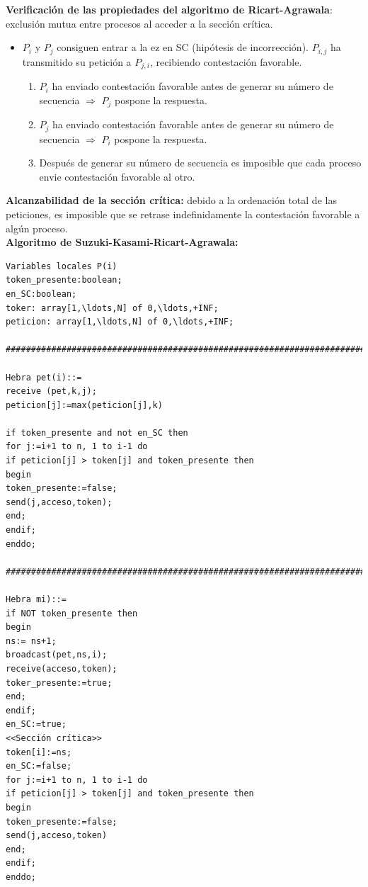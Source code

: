 \documentclass[a4paper,11pt]{article}
\begin{document}
\textbf{Verificación de las propiedades del algoritmo de Ricart-Agrawala}: exclusión mutua entre procesos al  acceder a la sección crítica.

\begin{itemize}
\item $P_i$ y $P_j $ consiguen entrar a la ez en SC (hipótesis de incorrección). $P_{i,j}$ ha transmitido su petición a $P_{j,i}$, recibiendo contestación favorable.

	\begin{enumerate}
		\item $P_i$ ha enviado contestación favorable antes de generar su número de secuencia $\Rightarrow$ $P_j$ pospone la respuesta.
		
		\item $P_j$ ha enviado contestación favorable antes de generar su número de secuencia $\Rightarrow$ $P_i$ pospone la respuesta.
		
		\item Después de generar su número de secuencia es imposible que cada proceso envie contestación favorable al otro.
	\end{enumerate}
\end{itemize}

\textbf{Alcanzabilidad de la sección crítica:} debido a la ordenación total de las peticiones, es imposible que se retrase indefinidamente la contestación favorable a algún proceso. \\

\textbf{Algoritmo de Suzuki-Kasami-Ricart-Agrawala:}

\begin{verbatim}
Variables locales P(i)
token_presente:boolean;
en_SC:boolean;
toker: array[1,\ldots,N] of 0,\ldots,+INF;
peticion: array[1,\ldots,N] of 0,\ldots,+INF;

########################################################################

Hebra pet(i)::=
receive (pet,k,j);
peticion[j]:=max(peticion[j],k)

if token_presente and not en_SC then
for j:=i+1 to n, 1 to i-1 do
if peticion[j] > token[j] and token_presente then
begin
token_presente:=false;
send(j,acceso,token);
end;
endif;
enddo;

########################################################################

Hebra mi)::=
if NOT token_presente then
begin
ns:= ns+1;
broadcast(pet,ns,i);
receive(acceso,token);
toker_presente:=true;
end;
endif;
en_SC:=true;
<<Sección crítica>>
token[i]:=ns;
en_SC:=false;
for j:=i+1 to n, 1 to i-1 do
if peticion[j] > token[j] and token_presente then
begin
token_presente:=false;
send(j,acceso,token)
end;
endif;
enddo;
\end{verbatim}
\end{document}
